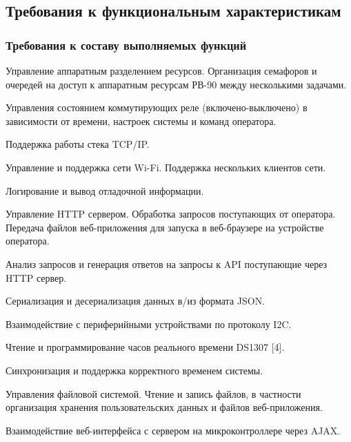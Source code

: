 

\subsection{Требования к функциональным характеристикам}
\subsubsection{Требования к составу выполняемых функций}
\begin{my_enumerate}
\item Управление аппаратным разделением ресурсов. Организация семафоров и очередей на доступ к аппаратным ресурсам РВ-90 между несколькими задачами.
\item Управления состоянием коммутирующих реле (включено-выключено) в зависимости от времени, настроек системы и команд оператора.
\item Поддержка работы стека TCP/IP.
\item Управление и поддержка сети Wi-Fi. Поддержка нескольких клиентов сети.
\item Логирование и вывод отладочной информации.
\item Управление HTTP сервером. Обработка запросов поступающих от оператора. Передача файлов веб-приложения для запуска в веб-браузере на устройстве оператора. 
\item Анализ запросов и генерация ответов на запросы к API поступающие через HTTP сервер.
\item Сериализация и десериализация данных в/из формата JSON.
\item Взаимодействие с периферийными устройствами по протоколу I2C.
\item Чтение и программирование часов реального времени DS1307 [4].
\item Синхронизация и поддержка корректного временем системы.
\item Управления файловой системой. Чтение и запись файлов, в частности организация хранения пользовательских данных и файлов веб-приложения.
\item Взаимодействие веб-интерфейса с сервером на микроконтроллере через AJAX.
\end{my_enumerate}


